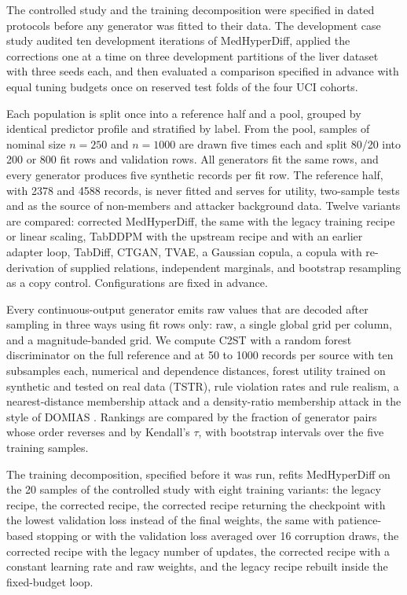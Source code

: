 \documentclass[pdflatex,referee]{sn-jnl}%
\begin{document}
The controlled study and the training decomposition were specified in dated protocols before any generator was fitted to their data. The development case study audited ten development iterations of MedHyperDiff, applied the corrections one at a time on three development partitions of the liver dataset with three seeds each, and then evaluated a comparison specified in advance with equal tuning budgets once on reserved test folds of the four UCI cohorts.

Each population is split once into a reference half and a pool, grouped by identical predictor profile and stratified by label. From the pool, samples of nominal size $n = 250$ and $n = 1000$ are drawn five times each and split 80/20 into 200 or 800 fit rows and validation rows. All generators fit the same rows, and every generator produces five synthetic records per fit row. The reference half, with 2378 and 4588 records, is never fitted and serves for utility, two-sample tests and as the source of non-members and attacker background data. Twelve variants are compared: corrected MedHyperDiff, the same with the legacy training recipe or linear scaling, TabDDPM with the upstream recipe and with an earlier adapter loop, TabDiff, CTGAN, TVAE, a Gaussian copula, a copula with re-derivation of supplied relations, independent marginals, and bootstrap resampling as a copy control. Configurations are fixed in advance.

Every continuous-output generator emits raw values that are decoded after sampling in three ways using fit rows only: raw, a single global grid per column, and a magnitude-banded grid. We compute C2ST with a random forest discriminator on the full reference and at 50 to 1000 records per source with ten subsamples each, numerical and dependence distances, forest utility trained on synthetic and tested on real data (TSTR), rule violation rates and rule realism, a nearest-distance membership attack and a density-ratio membership attack in the style of DOMIAS \cite{vanbreugel2023domias}. Rankings are compared by the fraction of generator pairs whose order reverses and by Kendall's $\tau$, with bootstrap intervals over the five training samples.

The training decomposition, specified before it was run, refits MedHyperDiff on the 20 samples of the controlled study with eight training variants: the legacy recipe, the corrected recipe, the corrected recipe returning the checkpoint with the lowest validation loss instead of the final weights, the same with patience-based stopping or with the validation loss averaged over 16 corruption draws, the corrected recipe with the legacy number of updates, the corrected recipe with a constant learning rate and raw weights, and the legacy recipe rebuilt inside the fixed-budget loop.
\end{document}
